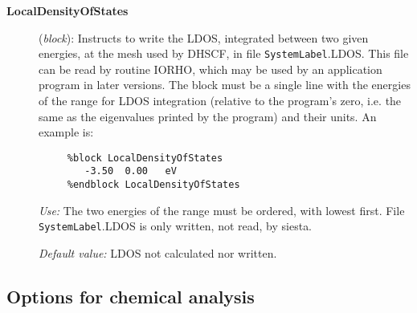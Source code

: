 \documentclass[11pt]{article}
\begin{document}
\begin{description}
\item[{\bf LocalDensityOfStates}] ({\it block}):
Instructs to write the LDOS, integrated between two given energies,
at the mesh used by DHSCF,
in file {\tt SystemLabel}.LDOS. This file can be read by routine IORHO,
which may be used by an application program in later versions.
The block must be a single line with the energies of the range for
LDOS integration
(relative to the program's zero, i.e. the same as the eigenvalues
printed by the program) and their units.
An example is:

\begin{verbatim}
     %block LocalDensityOfStates
        -3.50  0.00   eV
     %endblock LocalDensityOfStates
\end{verbatim}

{\it Use:} The two energies of the range must be ordered,
with lowest first.
File {\tt SystemLabel}.LDOS is only written, not read, by siesta.

{\it Default value:} LDOS not calculated nor written.

\end{description}


\subsection{Options for chemical analysis}
\end{document}
